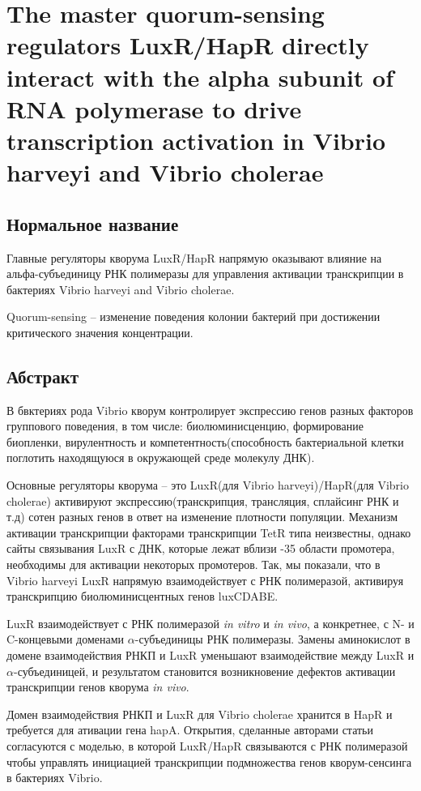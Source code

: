 \section{The master quorum-sensing regulators LuxR/HapR directly interact with the alpha subunit of RNA polymerase to drive transcription activation in Vibrio harveyi and Vibrio cholerae}

\subsection{Нормальное название}

Главные регуляторы кворума LuxR/HapR напрямую оказывают влияние на альфа-субъединицу РНК полимеразы для управления активации транскрипции в бактериях Vibrio harveyi and Vibrio cholerae.

Quorum-sensing -- изменение поведения колонии бактерий при достижении критического значения концентрации.
\subsection{Абстракт}

В бвктериях рода Vibrio кворум контролирует экспрессию генов разных факторов группового поведения, в том числе: биолюминисценцию, формирование биопленки, вирулентность и компетентность(способность бактериальной клетки поглотить находящуюся в окружающей среде молекулу ДНК).

Основные регуляторы кворума -- это LuxR(для Vibrio harveyi)/HapR(для Vibrio cholerae) активируют экспрессию(транскрипция, трансляция, сплайсинг РНК и т.д) сотен разных генов в ответ на изменение плотности популяции. Механизм активации транскрипции факторами транскрипции TetR типа неизвестны, однако сайты связывания LuxR с ДНК, которые лежат вблизи -35 области промотера, необходимы для активации некоторых промотеров. Так, мы показали, что в Vibrio harveyi LuxR
напрямую взаимодействует с РНК полимеразой, активируя транскрипцию  биолюминисцентных генов luxCDABE.

LuxR взаимодействует с РНК полимеразой \textit{in vitro} и \textit{in vivo}, а конкретнее, с N- и C-концевыми доменами $\alpha$-субъединицы РНК полимеразы. Замены аминокислот в домене взаимодействия РНКП и LuxR уменьшают взаимодействие между LuxR и $\alpha$-субъединицей, и результатом становится возникновение дефектов активации транскрипции генов кворума \textit{in vivo}.

Домен взаимодействия РНКП и LuxR для Vibrio cholerae хранится в HapR и требуется для ативации гена hapA. Открытия, сделанные авторами статьи согласуются с моделью, в которой LuxR/HapR связываются с РНК полимеразой чтобы управлять инициацией транскрипции подмножества генов кворум-сенсинга в бактериях Vibrio.

